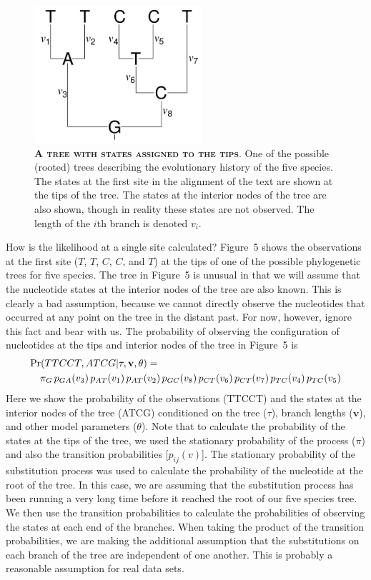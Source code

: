 \documentclass{svmult}
\begin{document}
\begin{figure}[t]
\centering
\includegraphics[height=2in]{fig5}
\caption{\textbf{\textsc{A tree with states assigned to the tips}}.
One of the possible (rooted) trees describing the evolutionary history of the five species. The states at the first
site in the alignment of the text are shown at the tips of the tree. The states at the interior nodes of the tree are also
shown, though in reality these states are not observed. The length of the $i$th branch is denoted $v_i$. }
\label{fig5}
\end{figure}

How is the likelihood at a single site calculated? Figure~5 shows the observations at the first site ($T$, $T$, $C$, $C$, and $T$)
at the tips of one of the possible phylogenetic trees for five species. The tree in Figure~5 is unusual in that we will
assume that the nucleotide states at the interior nodes of the tree are also known. This is clearly a bad assumption, because
we cannot directly observe the nucleotides that occurred at any point on the tree in the distant past. For now, however, ignore
this fact and bear with us. The probability of observing the configuration of nucleotides at the tips and interior nodes of
the tree in Figure~5 is
\begin{eqnarray*}
\lefteqn{\Pr(TTCCT , ATCG | \tau, {\mathbf v}, \theta ) =} \\
& & \pi_G \,
p_{GA}(v_3) \,
p_{AT}(v_1) \,
p_{AT}(v_2) \,
p_{GC}(v_8) \,
p_{CT}(v_6) \,
p_{CT}(v_7) \,
p_{TC}(v_4) \,
p_{TC}(v_5)
\end{eqnarray*}
Here we show the probability of the observations (TTCCT) and the states at the interior nodes of the tree (ATCG)
conditioned on the tree ($\tau$), branch lengths (${\mathbf v}$), and other model parameters  ($\theta$).
Note that to calculate the probability of the states at the tips of the tree, we used the stationary probability
of the process ($\pi$) and also the transition probabilities [$p_{ij}(v)$]. The stationary probability of the substitution
process was used to calculate the probability of the nucleotide at the root of the tree. In this case, we are assuming that
the substitution process has been running a very long time before it reached the root of our five species tree. We then use
the transition probabilities to calculate the probabilities of observing the states at each end of the branches. When taking
the product of the transition probabilities, we are making the additional assumption that the substitutions on each branch
of the tree are independent of one another. This is probably a reasonable assumption for real data sets.
\end{document}
